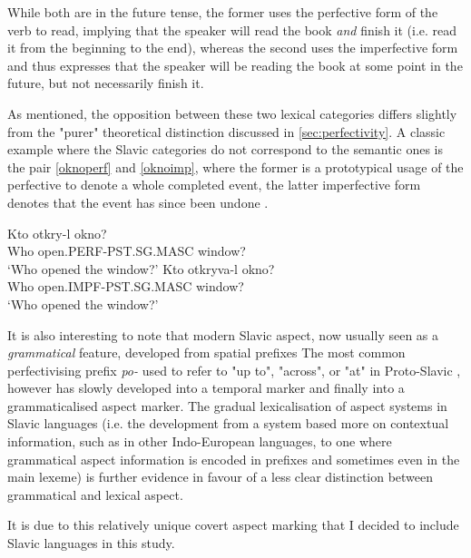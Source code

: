 While both are in the future tense, the former uses the perfective form of the verb to read, implying that the speaker will read the book \emph{and} finish it (i.e. read it from the beginning to the end), whereas the second uses the imperfective form and thus expresses that the speaker will be reading the book at some point in the future, but not necessarily finish it.

As mentioned, the opposition between these two lexical categories differs slightly from the "purer" theoretical distinction discussed in \ref{sec:perfectivity}. A classic example where the Slavic categories do not correspond to the semantic ones is the pair \ref{oknoperf} and \ref{oknoimp}, where the former is a prototypical usage of the perfective to denote a whole completed event, the latter imperfective form denotes that the event has since been undone \citep{franks2005slavic}.

\begin{exe}
    \ex \gll Kto otkry-l okno? \\
            Who open.PERF-PST.SG.MASC window? \\
        \glt `Who opened the window?'
    \label{oknoperf}
    \ex \gll Kto otkryva-l okno? \\
            Who open.IMPF-PST.SG.MASC window? \\
        \glt `Who opened the window?'
    \label{oknoimp}
\end{exe}

It is also interesting to note that modern Slavic aspect, now usually seen as a \emph{grammatical} feature, developed from spatial prefixes \citep{prefixation_in_rise_of_slav_asp} The most common perfectivising prefix \emph{po-} used to refer to "up to", "across", or "at" in Proto-Slavic \citep{Derksen2008EtymologicalDO}, however has slowly developed into a temporal marker and finally into a grammaticalised aspect marker. The gradual lexicalisation of aspect systems in Slavic languages (i.e. the development from a system based more on contextual information, such as in other Indo-European languages, to one where grammatical aspect information is encoded in prefixes and sometimes even in the main lexeme) is further evidence in favour of a less clear distinction between grammatical and lexical aspect.

It is due to this relatively unique covert aspect marking that I decided to include Slavic languages in this study.

